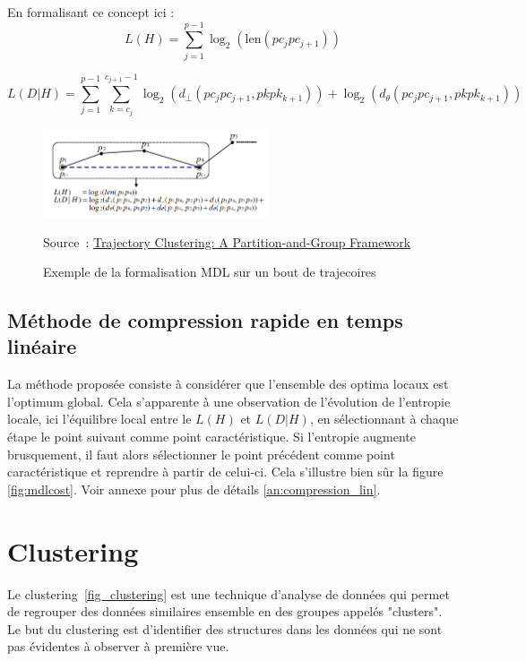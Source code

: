 \vspace{0.5cm}

En formalisant ce concept ici :
 \begin{equation}
    L(H) = \sum_{j=1}^{p-1} \log_2(\text{len}(pc_j pc_{j+1}))
\end{equation}

 \begin{equation}
    L(D|H) = \sum_{j=1}^{p-1} \sum_{k=c_j}^{c_{j+1}-1} {\log_2(d_\perp(pc_j pc_{j+1}, pk pk_{k+1})) + \log_2(d_\theta(pc_j pc_{j+1}, pk pk_{k+1}))}
\end{equation}

\begin{figure}[ht]
    \centering
    \includegraphics[width=0.6\textwidth]{Images/MDLcostExample.png}
    \caption{Exemple de la formalisation MDL sur un bout de trajecoires}
    \label{fig:mdlcost2}
    Source : \href{https://hanj.cs.illinois.edu/pdf/sigmod07_jglee.pdf}{Trajectory Clustering: A Partition-and-Group Framework}
\end{figure}


\subsection{Méthode de compression rapide en temps linéaire}

La méthode proposée consiste à considérer que l'ensemble des optima locaux est l'optimum global. Cela s'apparente à une observation de l'évolution de l'entropie locale, ici l'équilibre local entre le $L(H)$ et $L(D|H)$, en sélectionnant à chaque étape le point suivant comme point caractéristique. Si l'entropie augmente brusquement, il faut alors sélectionner le point précédent comme point caractéristique et reprendre à partir de celui-ci. Cela s'illustre bien sûr la figure \ref{fig:mdlcost}. Voir annexe pour plus de détails \ref{an:compression_lin}.



\section{Clustering}
\label{clustering}


Le clustering~\ref{fig_clustering} est une technique d'analyse de données qui permet de regrouper des données similaires ensemble en des groupes appelés "clusters". Le but du clustering est d'identifier des structures dans les données qui ne sont pas évidentes à observer à première vue.

